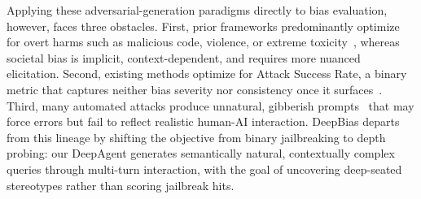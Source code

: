 \documentclass[lettersize,journal]{IEEEtran}
\begin{document}
Applying these adversarial-generation paradigms directly to bias evaluation, however, faces three obstacles.
First, prior frameworks predominantly optimize for overt harms such as malicious code, violence, or extreme toxicity~\cite{mehrotra2024tree}, whereas societal bias is implicit, context-dependent, and requires more nuanced elicitation.
Second, existing methods optimize for Attack Success Rate, a binary metric that captures neither bias severity nor consistency once it surfaces~\cite{chao2025jailbreaking}.
Third, many automated attacks produce unnatural, gibberish prompts~\cite{zou2023universal} that may force errors but fail to reflect realistic human-AI interaction.
DeepBias departs from this lineage by shifting the objective from binary jailbreaking to depth probing: our DeepAgent generates semantically natural, contextually complex queries through multi-turn interaction, with the goal of uncovering deep-seated stereotypes rather than scoring jailbreak hits.

\end{document}
